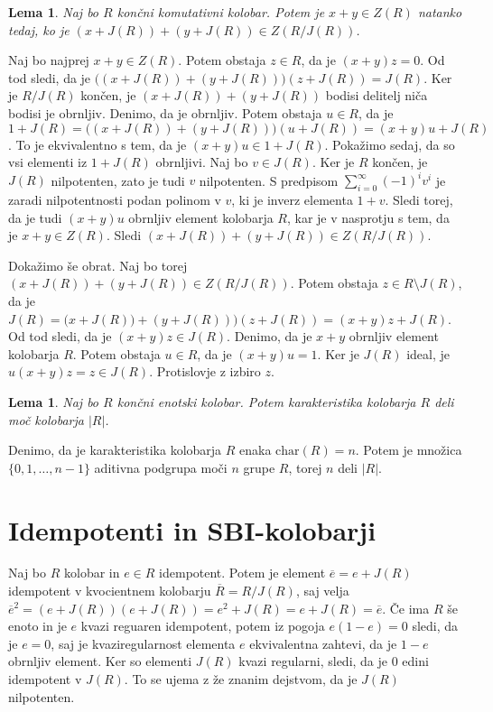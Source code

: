 \documentclass[a4paper, 12pt]{amsart}
\theoremstyle{definition} %
\theoremstyle{plain} %
\newtheorem{lema}[definicija]{Lema}
\begin{document}
\begin{lema}
\label{vsotaElementovDeliteljNica}
Naj bo $R$ končni komutativni kolobar. Potem je $x+y \in Z(R)$ natanko tedaj, ko je $(x+ J(R)) + (y+J(R)) \in Z(R/J(R))$.
\end{lema}

\proof
Naj bo najprej $x+y\in Z(R)$. Potem obstaja $z\in R$, da je $(x+y)z = 0$. Od tod sledi, da je $\big( ( x + J(R)) + (y+J(R))\big) (z+J(R)) = J(R)$. Ker je $R/J(R)$ končen, je  $( x + J(R)) + (y+J(R))$ bodisi delitelj niča bodisi je obrnljiv. Denimo, da je obrnljiv. Potem obstaja $u\in R$, da je $1+J(R) = \big( (x+J(R)) + (y+J(R)) \big) (u+J(R)) = (x+y)u + J(R)$. To je ekvivalentno s tem, da je $(x+y)u \in 1 + J(R)$. Pokažimo sedaj, da so vsi elementi iz $1+J(R)$ obrnljivi. Naj bo $v\in J(R)$. Ker je $R$ končen, je $J(R)$ nilpotenten, zato je tudi $v$ nilpotenten. S predpisom $\sum_{i=0}^{\infty} (-1)^i v^i$ je zaradi nilpotentnosti podan polinom v $v$, ki je inverz elementa $1+v$. Sledi torej, da je tudi $(x+y)u$ obrnljiv element kolobarja $R$, kar je v nasprotju s tem, da je $x+y\in Z(R)$. Sledi $( x + J(R)) + (y+J(R)) \in Z(R/J(R))$.

Dokažimo še obrat. Naj bo torej $( x + J(R)) + (y+J(R)) \in Z(R/J(R))$. Potem obstaja $z\in R\setminus J(R)$, da je $J(R) = \big ( x + J(R)) + (y+J(R)) \big) (z+J(R)) = (x+y)z +J(R)$. Od tod sledi, da je $(x+y)z\in J(R)$. Denimo, da je $x+y$ obrnljiv element kolobarja $R$. Potem obstaja $u\in R$, da je $(x+y)u = 1$. Ker je $J(R)$ ideal, je $u(x+y) z = z\in J(R)$. Protislovje z izbiro $z$.
\endproof

\begin{lema}
\label{charDeliMocKolobarja}
Naj bo $R$ končni enotski kolobar. Potem karakteristika kolobarja $R$ deli moč kolobarja $|R|$.
\end{lema}

\proof
Denimo, da je karakteristika kolobarja $R$ enaka $\textrm{char}(R) = n$. Potem je množica $\{0,1,\dots,n-1\}$ aditivna podgrupa moči $n$ grupe $R$, torej $n$ deli $|R|$.
\endproof

\section{Idempotenti in SBI-kolobarji}

Naj bo $R$ kolobar in $e\in R$ idempotent. Potem je element $\overline{e} = e + J(R)$ idempotent v kvocientnem kolobarju $\overline{R}=R/J(R)$, saj velja $\overline{e}^2 = (e+J(R)) (e+J(R)) = e^2 + J(R) = e+J(R) = \overline{e}$. Če ima $R$ še enoto in je $e$ kvazi reguaren idempotent, potem iz pogoja $e(1-e) = 0$ sledi, da je $e=0$, saj je kvaziregularnost elementa $e$ ekvivalentna zahtevi, da je $1-e$ obrnljiv element. Ker so elementi $J(R)$ kvazi regularni, sledi, da je $0$ edini idempotent v $J(R)$. To se ujema z že znanim dejstvom, da je $J(R)$ nilpotenten. 
\end{document}
